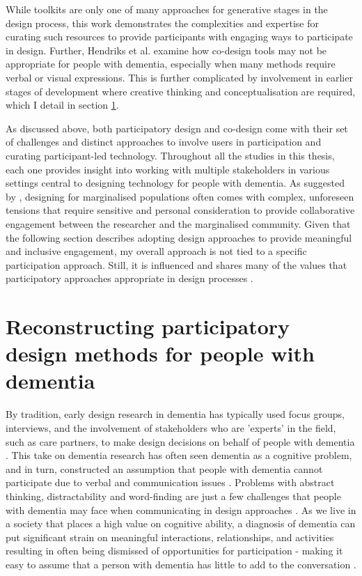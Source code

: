 While toolkits are only one of many approaches for generative stages in the design process, this work demonstrates the complexities and expertise for curating such resources to provide participants with engaging ways to participate in design. Further, Hendriks et al. examine how co-design tools may not be appropriate for people with dementia, especially when many methods require verbal or visual expressions. This is further complicated by involvement in earlier stages of development where creative thinking and conceptualisation are required, which I detail in section \ref{method:DementiaPD}.

As discussed above, both participatory design and co-design come with their set of challenges and distinct approaches to involve users in participation and curating participant-led technology. Throughout all the studies in this thesis, each one provides insight into working with multiple stakeholders in various settings central to designing technology for people with dementia. As suggested by \cite{harrington_deconstructing_2019}, designing for marginalised populations often comes with complex, unforeseen tensions that require sensitive and personal consideration to provide collaborative engagement between the researcher and the marginalised community. Given that the following section describes adopting design approaches to provide meaningful and inclusive engagement, my overall approach is not tied to a specific participation approach. Still, it is influenced and shares many of the values that participatory approaches appropriate in design processes \citep{hansen2019participatory}.



\section{Reconstructing participatory design methods for people with dementia}
\label{method:DementiaPD}
By tradition, early design research in dementia has typically used focus groups, interviews, and the involvement of stakeholders who are ’experts’ in the field, such as care partners, to make design decisions on behalf of people with dementia \citep{branco_personalised_2017}. This take on dementia research has often seen dementia as a cognitive problem, and in turn, constructed an assumption that people with dementia cannot participate due to verbal and communication issues \citep{hwang2020exploring}. Problems with abstract thinking, distractability and word-finding are just a few challenges that people with dementia may face when communicating in design approaches \citep{banovic2018communication}. As we live in a society that places a high value on cognitive ability, a diagnosis of dementia can put significant strain on meaningful interactions, relationships, and activities resulting in often being dismissed of opportunities for participation - making it easy to assume that a person with dementia has little to add to the conversation \citep{bartlett2010broadening}.


